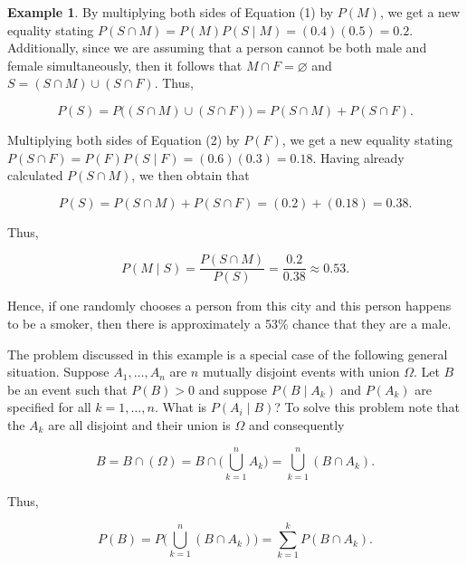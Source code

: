 \documentclass{article}
\theoremstyle{definition}
\theoremstyle{remark}
\theoremstyle{definition}
\newtheorem{example}{Example}[section]
\begin{document}
\begin{example}
    \noindent By multiplying both sides of Equation (1) by $P(M)$, we get a new equality stating $P(S\cap M)=P(M)P(S\mid M)=(0.4)(0.5)=0.2$. Additionally, since we are assuming that a person cannot be both male and female simultaneously, then it follows that $M\cap F=\varnothing$ and $S=(S\cap M)\cup(S\cap F)$. Thus, 
    
    \begin{equation}
        P(S)=P\bigg((S\cap M)\cup(S\cap F)\bigg)=P(S\cap M)+P(S\cap F).
    \end{equation}
    
    Multiplying both sides of Equation (2) by $P(F)$, we get a new equality stating $P(S\cap F)=P(F)P(S\mid F)=(0.6)(0.3)=0.18$. Having already calculated $P(S\cap M)$, we then obtain that
    
    \begin{equation}
        P(S)=P(S\cap M)+P(S\cap F)=(0.2)+(0.18)=0.38.
    \end{equation}
    
    \noindent Thus, 
    
    \begin{equation*}
        P(M\mid S)= \frac{P(S\cap M)}{P(S)}=\frac{0.2}{0.38}\approx 0.53.
    \end{equation*}
    
    \noindent Hence, if one randomly chooses a person from this city and this person happens to be a smoker, then there is approximately a 53$\%$ chance that they are a male.
\end{example}

The problem discussed in this example is a special case of the following general situation. Suppose $A_1, \dots, A_n$ are $n$ mutually disjoint events with union $\Omega$. Let $B$ be an event such that $P(B)>0$ and suppose $P(B\mid A_k)$ and $P(A_k)$ are specified for all $k=1,\dots, n$. What is $P(A_i\mid B)$? To solve this problem note that the $A_k$ are all disjoint and their union is $\Omega$ and consequently

\begin{equation*}
    B=B\cap(\Omega)=B\cap\bigg(\bigcup_{k=1}^{n}A_k\bigg)=\bigcup_{k=1}^{n}(B\cap A_k).
\end{equation*}

\noindent Thus, 

\begin{equation*}
    P(B)=P\bigg(\bigcup_{k=1}^{n}(B\cap A_k)\bigg)=\sum_{k=1}^{k}P(B\cap A_k).
\end{equation*}
\end{document}
